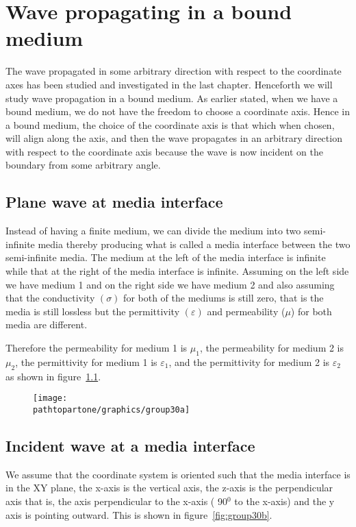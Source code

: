 \chapter{Wave propagating in a bound medium}\label{lec:lec30}
The wave propagated in some arbitrary direction with respect to the coordinate axes has been studied and investigated in the last chapter. Henceforth we will study wave propagation in a bound medium. As earlier stated, when we have a bound medium, we do not have the freedom to choose a coordinate axis. Hence in a bound medium, the choice of the coordinate axis is that which when chosen, will align along the axis, and then the wave propagates in an arbitrary direction with respect to the coordinate axis because the wave is now incident on the boundary from some arbitrary angle.

\section{Plane wave at media interface}

Instead of having a finite medium, we can divide the medium into two semi-infinite media thereby producing what is called a media interface between the two semi-infinite media. The medium at the left of the media interface is infinite while that at the right of the media interface is infinite. Assuming on the left side we have medium 1 and on the right side we have medium 2 and also assuming that the conductivity $(\sigma)$ for both of the mediums is still zero, that is the media is still lossless but the permittivity $(\varepsilon)$ and permeability ($\mu$) for both media are different.

Therefore the permeability for medium 1 is $\mu_1$, the permeability for medium 2 is $\mu_2$, the permittivity for medium 1 is $\varepsilon_1$, and the permittivity for medium 2 is $\varepsilon_2$ as shown in figure~\ref{fig:group30a}.

\begin{figure}[h]
\centering
\texttt{[image: \\pathtopartone/graphics/group30a]}
\caption{}
\label{fig:group30a}
\end{figure}

\section{Incident wave at a media interface}
We assume that the coordinate system is oriented such that the media interface is in the XY plane, the x-axis is the vertical axis, the z-axis is the perpendicular axis that is, the axis perpendicular to the x-axis ( 90$^{0}$ to the x-axis) and the y axis is pointing outward. This is shown in figure~\ref{fig:group30b}.

